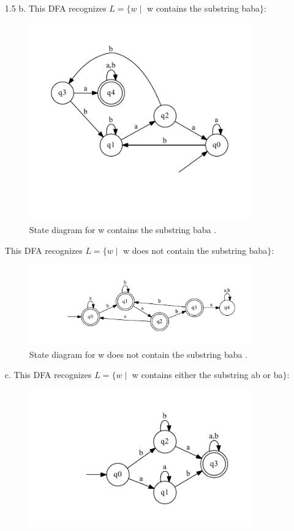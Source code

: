 \documentclass[10pt] {article}
\begin{document}
\begin{enumerate}
\begin{figure}[H]
\end{figure}
\item[1.5]
b. This DFA recognizes $L = \{ w \mid$ w contains the substring baba$\}$:
\begin{figure}[H]
\includegraphics[width=0.9\textwidth]{ba15.pdf}
\caption{State diagram for w contains the substring baba .}
\label{10}
\end{figure}
This DFA recognizes $L = \{ w \mid$ w does not contain the substring baba$\}$:
\begin{figure}[H]
\includegraphics[width=0.9\textwidth]{bb15.pdf}
\caption{State diagram for w does not contain the substring baba .}
\label{11}
\end{figure}
c. This DFA recognizes $L = \{ w \mid$ w contains either the substring ab or ba$\}$:
\begin{figure}[H]
\includegraphics[width=0.9\textwidth]{ca15.pdf}

\end{figure}
\end{enumerate}
\end{document}
